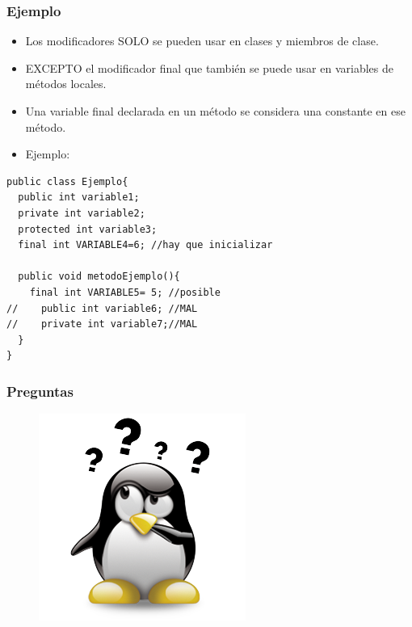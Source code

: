 \documentclass{beamer}
\begin{document}
\begin{frame}[fragile]
\frametitle{Ejemplo}
\begin{itemize}[<+->]
\item Los modificadores SOLO se pueden usar en clases y miembros de clase.
\item EXCEPTO el modificador final que también se puede usar en variables de métodos locales.
\item Una variable final declarada en un método se considera una constante en ese método.
\item Ejemplo:
\end{itemize}
\pause
\begin{small}
\begin{verbatim}
public class Ejemplo{
  public int variable1;
  private int variable2;
  protected int variable3;
  final int VARIABLE4=6; //hay que inicializar

  public void metodoEjemplo(){
    final int VARIABLE5= 5; //posible
//    public int variable6; //MAL
//    private int variable7;//MAL
  }
}
\end{verbatim}
\end{small}
\end{frame}

\begin{frame}
\frametitle{Preguntas} 
\begin{figure}
\includegraphics[scale=0.9]{imagenes/dudas.png}
\end{figure} 
\end{frame}
\end{document}
